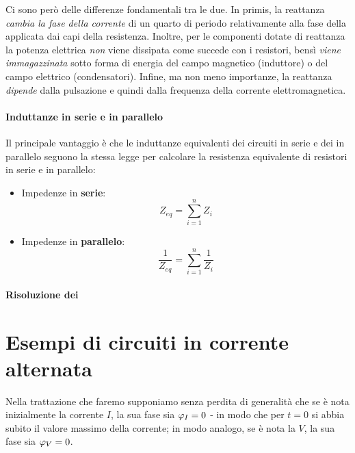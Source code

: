Ci sono però delle differenze fondamentali tra le due. In primis, la reattanza \textit{cambia la fase della corrente}  di un quarto di periodo relativamente alla fase della \ddp applicata dai capi della resistenza.
Inoltre, per le componenti dotate di reattanza la potenza elettrica \textit{non} viene dissipata come succede con i resistori, bensì \textit{viene immagazzinata} sotto forma di energia del campo magnetico (induttore) o del campo elettrico (condensatori).
Infine, ma non meno importanze, la reattanza \textit{dipende} dalla pulsazione e quindi dalla frequenza della corrente elettromagnetica.
\paragraph{Induttanze in serie e in parallelo}
Il principale vantaggio è che le induttanze equivalenti dei circuiti in serie e dei in parallelo seguono la stessa legge per calcolare la resistenza equivalente di resistori in serie e in parallelo:
\begin{itemize}
	\item Impedenze in \textbf{serie}:
	\begin{equation}
		Z_{eq}=\sum_{i=1}^{n}Z_i
	\end{equation}
	\item Impedenze in \textbf{parallelo}:
	\begin{equation}
		\frac{1}{Z_{eq}}=\sum_{i=1}^{n}\frac{1}{Z_i}
	\end{equation}
\end{itemize}
\paragraph{Risoluzione dei}
\section{Esempi di circuiti in corrente alternata}
Nella trattazione che faremo supponiamo senza perdita di generalità che se è nota inizialmente la corrente $I$, la sua fase sia $\oldphi_I=0$ - in modo che per $t=0$ si abbia subito il valore massimo della corrente; in modo analogo, se è nota la \ddp $V$, la sua fase sia $\oldphi_V=0$.
